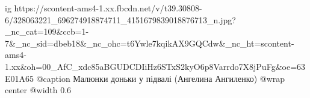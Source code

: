  
 
 
 
 



\ifcmt
  ig https://scontent-ams4-1.xx.fbcdn.net/v/t39.30808-6/328063221_696274918874711_4151679839018876713_n.jpg?_nc_cat=109&ccb=1-7&_nc_sid=dbeb18&_nc_ohc=t6Ywle7kqikAX9GQCdw&_nc_ht=scontent-ams4-1.xx&oh=00_AfC_xdc85aBGUDCDIiHz6STxS2kyO6p8Varrdo7X8jPuFg&oe=63E01A65
  @caption Малюнки доньки у підвалі (Ангелина Ангиленко)
  @wrap center
  @width 0.6
\fi
